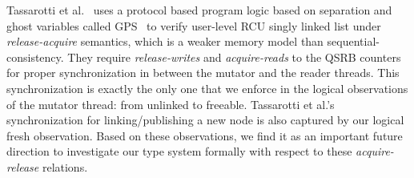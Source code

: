  Tassarotti et al.~\cite{verrcu} uses a protocol based program logic based on separation and ghost variables called \textsf{GPS}~\cite{Turon:2014:GNW:2660193.2660243} to verify user-level \textsf{RCU} singly linked list under \emph{release-acquire} semantics, which is a weaker memory model than sequential-consistency. They require \textit{release-writes} and \textit{acquire-reads} to the QSRB counters for proper synchronization in between the mutator and the reader threads. This synchronization is exactly the only one that we enforce in the logical observations of the mutator thread: from \textsf{unlinked} to \textsf{freeable}. Tassarotti et al.'s synchronization for linking/publishing a new node is also captured by our logical \textsf{fresh} observation. Based on these observations, we find it as an important future direction to investigate our type system formally with respect to these \textit{acquire-release} relations.

